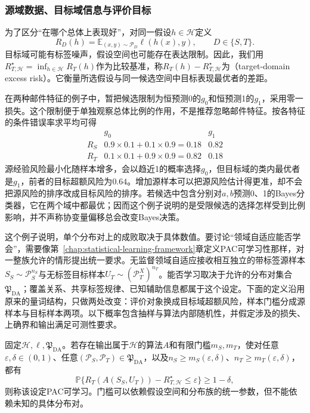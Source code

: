 \subsubsection{源域数据、目标域信息与评价目标}
\label{sec:transfer-pac-setting}

为了区分“在哪个总体上表现好”，对同一假设$h\in\mathcal H$定义
\begin{equation}
 R_D(h)=\mathbb E_{(x,y)\sim\mathcal P_D}\ell(h(x),y),
 \qquad D\in\{S,T\}.
 \label{eq:transfer-population-risks}
\end{equation}
目标域可能有标签噪声，假设空间也可能存在表达限制。因此，我们用$R_{T,\mathcal H}^{\star}=\inf_{h\in\mathcal H}R_T(h)$作为比较基准，称$R_T(h)-R_{T,\mathcal H}^{\star}$为（target-domain excess risk）。它衡量所选假设与同一候选空间中目标表现最优者的差距。

在两种邮件特征的例子中，暂把候选限制为恒预测0的$g_0$和恒预测1的$g_1$，采用零一损失。这个限制便于单独观察总体比例的作用，不是推荐忽略邮件特征。按各特征的条件错误率求平均可得
\[
 \begin{array}{c|cc}
       &g_0&g_1\\ \hline
 R_S  &0.9\times0.1+0.1\times0.9=0.18&0.82\\
 R_T  &0.1\times0.1+0.9\times0.9=0.82&0.18
 \end{array}
\]
源经验风险最小化随样本增多，会以趋近1的概率选择$g_0$，但目标域的类内最优者是$g_1$，前者的目标超额风险为$0.64$。增加源样本可以把源风险估计得更准，却不会把源风险的排序改成目标风险的排序。若候选中包含分别对$a,b$预测0、1的Bayes分类器，它在两个域中都最优；因而这个例子说明的是受限候选的选择怎样受到比例影响，并不声称协变量偏移总会改变Bayes决策。

这个例子说明，单个分布对上的成败取决于具体数值。要讨论“领域自适应能否学会”，需要像第~\ref{chap:statistical-learning-framework}章定义PAC可学习性那样，对一整族允许的情形提出统一要求。无监督领域自适应接收相互独立的带标签源样本$S_S\sim\mathcal P_S^{n_S}$与无标签目标样本$U_T\sim(\mathcal P_T^X)^{n_T}$。能否学习取决于允许的分布对集合$\mathfrak P_{\mathrm{DA}}$；覆盖关系、共享标签规律、已知辅助信息都属于这个设定。下面的定义沿用原来的量词结构，只做两处改变：评价对象换成目标域超额风险，样本门槛分成源样本与目标样本两项。以下概率包含抽样与算法内部随机性，并假定涉及的损失、上确界和输出满足可测性要求。

\begin{definition}[领域自适应的PAC可学习性]
\label{def:adaptation-pac-learnability}
固定$\mathcal H,\ell,\mathfrak P_{\mathrm{DA}}$。若存在输出属于$\mathcal H$的算法$A$和有限门槛$m_S,m_T$，使对任意$\varepsilon,\delta\in(0,1)$、任意$(\mathcal P_S,\mathcal P_T)\in\mathfrak P_{\mathrm{DA}}$，以及$n_S\geq m_S(\varepsilon,\delta)$、$n_T\geq m_T(\varepsilon,\delta)$，都有
\[
 \mathbb P\{R_T(A(S_S,U_T))-R_{T,\mathcal H}^{\star}\leq\varepsilon\}
 \geq1-\delta,
\]
则称该设定PAC可学习。门槛可以依赖假设空间和分布族的统一参数，但不能依赖未知的具体分布对。
\end{definition}

